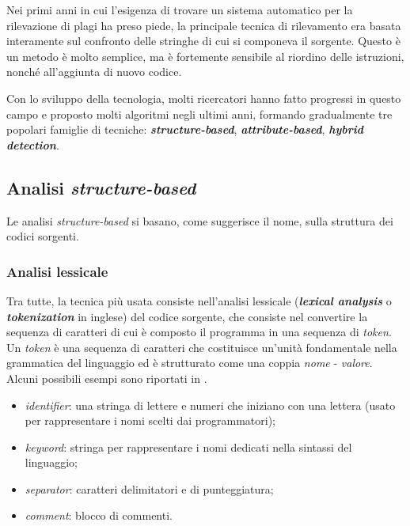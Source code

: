 Nei primi anni in cui l'esigenza di trovare un sistema automatico per la rilevazione di plagi ha preso piede, la principale tecnica di rilevamento era basata interamente sul confronto delle stringhe di cui si componeva il sorgente. 
%
Questo è un metodo è molto semplice, ma è fortemente sensibile al riordino delle istruzioni, nonché all'aggiunta di nuovo codice.

Con lo sviluppo della tecnologia, molti ricercatori hanno fatto progressi in questo campo e proposto molti algoritmi negli ultimi anni, formando gradualmente tre popolari famiglie di tecniche: \textbf{\textit{structure-based}}, \textbf{\textit{attribute-based}}, \textbf{\textit{hybrid detection}}. 

\subsection{Analisi \textit{structure-based}}

Le analisi \textit{structure-based} si basano, come suggerisce il nome, sulla struttura dei codici sorgenti.

\subsubsection{Analisi lessicale}
Tra tutte, la tecnica più usata consiste nell'analisi lessicale (\textbf{\textit{lexical analysis}} o \textbf{\textit{tokenization}} in inglese) del codice sorgente, che consiste nel convertire la sequenza di caratteri di cui è composto il programma in una sequenza di \textit{token}.
%
Un \textit{token} è una sequenza di caratteri che costituisce un'unità fondamentale nella grammatica del linguaggio ed è strutturato come una coppia \textit{nome} - \textit{valore}.
%
Alcuni possibili esempi sono riportati in .

\begin{itemize}
    \item \textit{identifier}: una stringa di lettere e numeri che iniziano con una lettera (usato per rappresentare i nomi scelti dai programmatori);
    \item \textit{keyword}: stringa per rappresentare i nomi dedicati nella sintassi del linguaggio;
    \item \textit{separator}: caratteri delimitatori e di punteggiatura;
    \item \textit{comment}: blocco di commenti.
\end{itemize}

